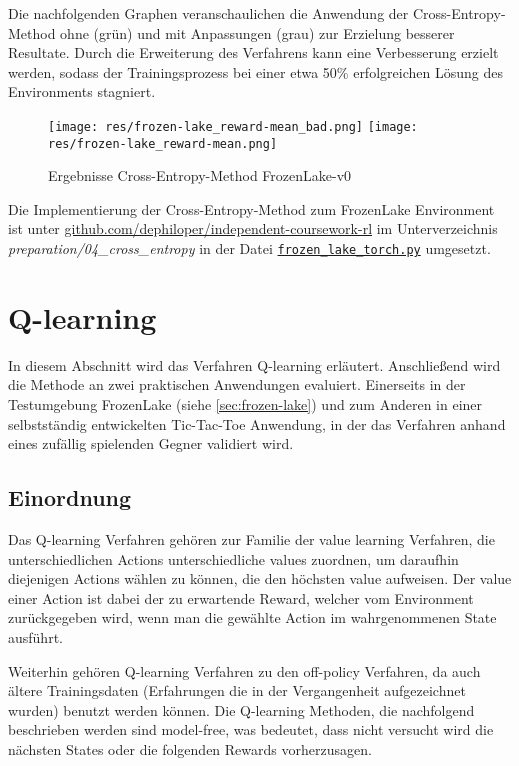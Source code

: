 \documentclass[11pt]{scrartcl}
\begin{document}
Die nachfolgenden Graphen veranschaulichen die Anwendung der Cross-Entropy-Method ohne (grün)
und mit Anpassungen (grau) zur Erzielung besserer Resultate. Durch die Erweiterung des
Verfahrens kann eine Verbesserung erzielt werden, sodass der Trainingsprozess bei einer
etwa 50\% erfolgreichen Lösung des Environments stagniert.

\begin{figure}[htp]
\centering
\texttt{[image: res/frozen-lake\_reward-mean\_bad.png]}
\texttt{[image: res/frozen-lake\_reward-mean.png]}
\caption{Ergebnisse Cross-Entropy-Method FrozenLake-v0}
\label{fig:frozen-lake_cross-entropy}
\end{figure}

Die Implementierung der Cross-Entropy-Method zum FrozenLake Environment ist unter
\url{github.com/dephiloper/independent-coursework-rl} im Unterverzeichnis 
\textit{preparation/04\_cross\_entropy} in der Datei 
\href{https://github.com/dephiloper/independent-coursework-rl/blob/master/preparation/04_cross_entropy/frozen_lake_torch.py}{\nolinkurl{frozen\_lake\_torch.py}} umgesetzt.
\newpage


\section{Q-learning}
In diesem Abschnitt wird das Verfahren Q-learning erläutert. Anschließend wird die Methode
an zwei praktischen Anwendungen evaluiert. Einerseits in der Testumgebung FrozenLake
(siehe \autoref{sec:frozen-lake}) und zum Anderen in einer selbstständig entwickelten
Tic-Tac-Toe Anwendung, in der das Verfahren anhand eines zufällig spielenden Gegner
validiert wird.


\subsection{Einordnung}
Das Q-learning Verfahren gehören zur Familie der value learning Verfahren, die
unterschiedlichen Actions unterschiedliche values zuordnen, um daraufhin diejenigen Actions
wählen zu können, die den höchsten value aufweisen. Der value einer Action ist dabei der
zu erwartende Reward, welcher vom Environment zurückgegeben wird, wenn man die gewählte
Action im wahrgenommenen State ausführt.

Weiterhin gehören Q-learning Verfahren zu den off-policy Verfahren, da auch ältere
Trainingsdaten (Erfahrungen die in der Vergangenheit aufgezeichnet wurden) benutzt
werden können. Die Q-learning Methoden, die nachfolgend beschrieben werden sind model-free,
was bedeutet, dass nicht versucht wird die nächsten States oder die folgenden Rewards
vorherzusagen.
\end{document}
